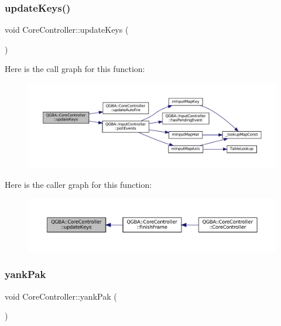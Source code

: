 \subsubsection{\texorpdfstring{update\+Keys()}{updateKeys()}}
{\footnotesize\ttfamily void Core\+Controller\+::update\+Keys (\begin{DoxyParamCaption}{ }\end{DoxyParamCaption})\hspace{0.3cm}{\ttfamily [private]}}

Here is the call graph for this function\+:
\nopagebreak
\begin{figure}[H]
\begin{center}
\leavevmode
\includegraphics[width=350pt]{class_q_g_b_a_1_1_core_controller_a1148fb5411b200cf1c5f67bfc7055eab_cgraph}
\end{center}
\end{figure}
Here is the caller graph for this function\+:
\nopagebreak
\begin{figure}[H]
\begin{center}
\leavevmode
\includegraphics[width=350pt]{class_q_g_b_a_1_1_core_controller_a1148fb5411b200cf1c5f67bfc7055eab_icgraph}
\end{center}
\end{figure}
\mbox{\label{class_q_g_b_a_1_1_core_controller_a21c0c9f1828be3312e5c6dbc40fdefc3}} 
\subsubsection{\texorpdfstring{yank\+Pak}{yankPak}}
{\footnotesize\ttfamily void Core\+Controller\+::yank\+Pak (\begin{DoxyParamCaption}{ }\end{DoxyParamCaption})\hspace{0.3cm}{\ttfamily [slot]}}


